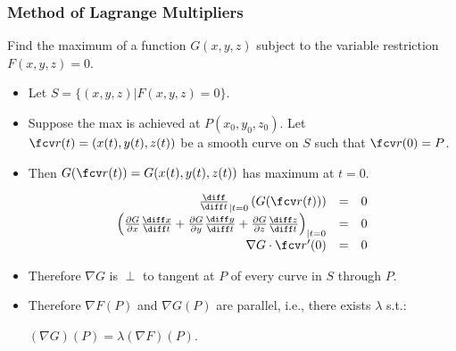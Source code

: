 \begin{frame}\frametitle{Method of Lagrange Multipliers}
\begin{problem}
Find the maximum of a function $G(x,y,z)$ subject to the variable restriction $F(x,y,z)=0$.
\end{problem}
\begin{itemize}
\item Let $S=\{(x,y,z)| F(x,y,z)=0 \}$. 
\item Suppose the max is achieved at $P(x_0,y_0,z_0)$. Let $\fcv r(t)=(x(t), y(t), z(t))$ be a smooth curve on $S$ such that $\fcv r(0)=P$.
\item Then $G(\fcv r(t))= G(x(t), y(t) ,z(t))$ has maximum at $t=0$. 

\[\begin{array}{rcl}
\frac{\diff}{\diff t}_{|t=0} \left(G(\fcv r(t)) \right)&=&0 \\
\left(\frac{\partial G}{\partial x}\frac{\diff x}{\diff t} +
\frac{\partial G}{\partial y}\frac{\diff y}{\diff t} +
\frac{\partial G}{\partial z}\frac{\diff z}{\diff t} \right)_{|t=0} &=&0\\
\nabla G\cdot \fcv r'(0)&=&0
\end{array}
\]
\item Therefore $\nabla G$ is $\perp$ to tangent at $P$ of every curve in $S$  through $P$. 
\item Therefore $\nabla F(P)$ and $\nabla G(P)$ are parallel, i.e., there exists $\lambda$ s.t.: 

$(\nabla G)(P)= \lambda (\nabla F)(P)$.
\end{itemize}


\end{frame}